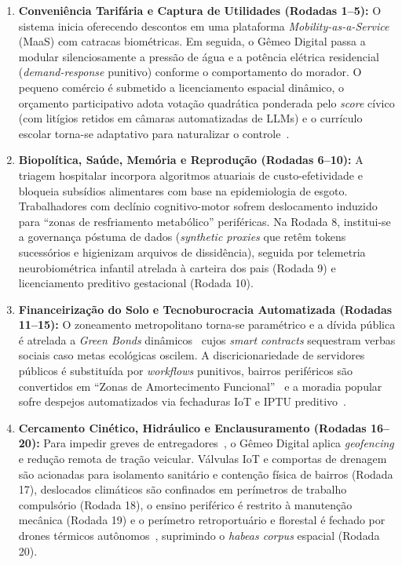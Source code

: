 \documentclass[runningheads]{llncs}
\begin{document}
\begin{enumerate}
    \item \textbf{Conveni\^encia Tarif\'aria e Captura de Utilidades (Rodadas 1--5):} O sistema inicia oferecendo descontos em uma plataforma \emph{Mobility-as-a-Service} (MaaS) com catracas biom\'etricas. Em seguida, o G\^emeo Digital passa a modular silenciosamente a press\~ao de \'agua e a pot\^encia el\'etrica residencial (\emph{demand-response} punitivo) conforme o comportamento do morador. O pequeno com\'ercio \'e submetido a licenciamento espacial din\^amico, o or\c{c}amento participativo adota vota\c{c}\~ao quadr\'atica ponderada pelo \emph{score} c\'ivico (com lit\'igios retidos em c\^amaras automatizadas de LLMs) e o curr\'iculo escolar torna-se adaptativo para naturalizar o controle~\cite{freitas2019termodinamica,misturini2018episodios}.
    \item \textbf{Biopol\'itica, Sa\'ude, Mem\'oria e Reprodu\c{c}\~ao (Rodadas 6--10):} A triagem hospitalar incorpora algoritmos atuariais de custo-efetividade e bloqueia subs\'idios alimentares com base na epidemiologia de esgoto. Trabalhadores com decl\'inio cognitivo-motor sofrem deslocamento induzido para ``zonas de resfriamento metab\'olico'' perif\'ericas. Na Rodada 8, institui-se a governan\c{c}a p\'ostuma de dados (\emph{synthetic proxies} que ret\^em tokens sucess\'orios e higienizam arquivos de dissid\^encia), seguida por telemetria neurobiom\'etrica infantil atrelada \`a carteira dos pais (Rodada 9) e licenciamento preditivo gestacional (Rodada 10).
    \item \textbf{Financeiriza\c{c}\~ao do Solo e Tecnoburocracia Automatizada (Rodadas 11--15):} O zoneamento metropolitano torna-se param\'etrico e a d\'ivida p\'ublica \'e atrelada a \emph{Green Bonds} din\^amicos~\cite{boite2020greenbonds} cujos \emph{smart contracts} sequestram verbas sociais caso metas ecol\'ogicas oscilem. A discricionariedade de servidores p\'ublicos \'e substitu\'ida por \emph{workflows} punitivos, bairros perif\'ericos s\~ao convertidos em ``Zonas de Amortecimento Funcional''~\cite{santos2019zoneamento} e a moradia popular sofre despejos automatizados via fechaduras IoT e IPTU preditivo~\cite{fernandes2022financeirizacao}.
    \item \textbf{Cercamento Cin\'etico, Hidr\'aulico e Enclausuramento (Rodadas 16--20):} Para impedir greves de entregadores~\cite{vanin2020cooperativismo}, o G\^emeo Digital aplica \emph{geofencing} e redu\c{c}\~ao remota de tra\c{c}\~ao veicular. V\'alvulas IoT e comportas de drenagem s\~ao acionadas para isolamento sanit\'ario e conten\c{c}\~ao f\'isica de bairros (Rodada 17), deslocados clim\'aticos s\~ao confinados em per\'imetros de trabalho compuls\'orio (Rodada 18), o ensino perif\'erico \'e restrito \`a manuten\c{c}\~ao mec\^anica (Rodada 19) e o per\'imetro retroportu\'ario e florestal \'e fechado por drones t\'ermicos aut\^onomos~\cite{santos2019zoneamento}, suprimindo o \emph{habeas corpus} espacial (Rodada 20).
\end{enumerate}
\end{document}

